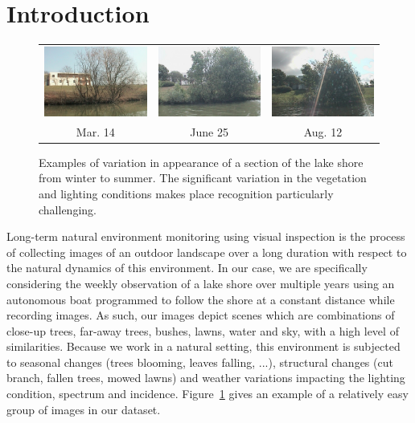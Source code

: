 \section{Introduction}
\begin{figure}[tb]
    \centering
    \begin{tabular}{c c c}
        \includegraphics[width=0.3\columnwidth]{siftflow-hard/140314-16329} &
        \includegraphics[width=0.3\columnwidth]{siftflow-hard/140625-23223}&
        \includegraphics[width=0.3\columnwidth]{siftflow-hard/140812-18224}  \\
        Mar. 14 & June 25 & Aug. 12\\
    \end{tabular}
    \caption{Examples of variation in appearance of a section of the lake shore from winter to summer. The significant variation in the vegetation and lighting conditions makes place recognition particularly challenging.} 
    \label{fig:dataset-hard}
\end{figure}

\label{sec:intro}
Long-term natural environment monitoring using visual inspection is the process
of collecting images of an outdoor landscape over a long duration with respect
to the natural dynamics of this environment. In our case, we are specifically
considering the weekly observation of a lake shore over multiple years using an autonomous boat
programmed to follow the shore at a constant distance while recording images.
As such, our images depict scenes which are combinations of close-up trees, far-away trees, bushes,
lawns, water and sky, with a high level of similarities. Because we work in a
natural setting, this environment is subjected to seasonal changes (trees
blooming, leaves falling, ...), structural changes (cut branch, fallen trees,
mowed lawns) and weather variations impacting the lighting condition, spectrum
and incidence. Figure~\ref{fig:dataset-hard} gives an example of a relatively easy group
of images in our dataset.

